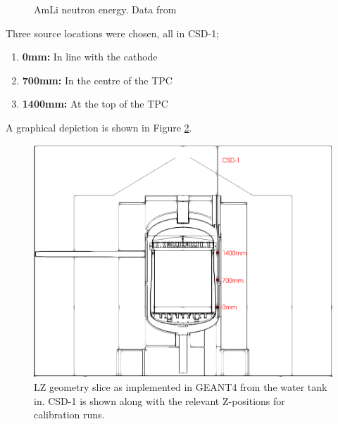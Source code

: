 \begin{figure}[!htbp]
    \centering
    \caption{AmLi neutron energy. Data from \cite{amli_neutron_energy_ref} }
    \label{fig:amli_neutron_energy_spectrum}
\end{figure}

\par
Three source locations were chosen, all in CSD-1;
\begin{enumerate}
    \item \textbf{0mm:} In line with the cathode
    \item \textbf{700mm:} In the centre of the TPC
    \item \textbf{1400mm:} At the top of the TPC
\end{enumerate}
A graphical depiction is shown in Figure \ref{fig:CSD1_Geometry}. 

\begin{figure}[!htbp]
\centering
\includegraphics[width=\textwidth]{Figures/Geometry/csd1_geometry_black_and_white.png}
\caption{LZ geometry slice as implemented in GEANT4 from the water tank in. CSD-1 is shown along with the relevant Z-positions for calibration runs.}
\label{fig:CSD1_Geometry}
\end{figure}


